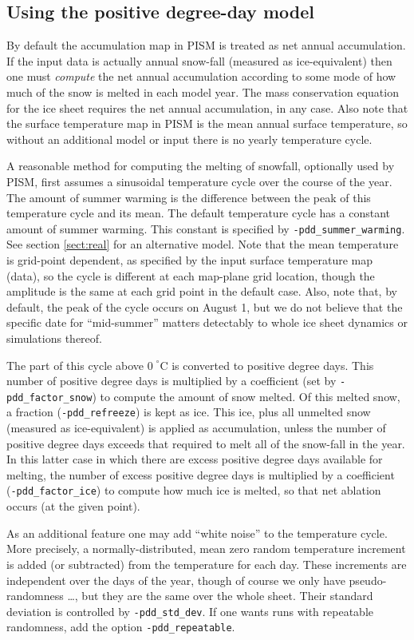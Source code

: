 \documentclass[11pt,final]{amsart}
\begin{document}
\subsection{Using the positive degree-day model}  \label{subsect:pdd}  By default the accumulation map in PISM is treated as net annual accumulation.  If the input data is actually annual snow-fall (measured as ice-equivalent) then one must \emph{compute} the net annual accumulation according to some mode of how much of the snow is melted in each model year.  The mass conservation equation for the ice sheet requires the net annual accumulation, in any case.  Also note that the surface temperature map in PISM is the mean annual surface temperature, so without an additional model or input there is no yearly temperature cycle.

A reasonable method for computing the melting of snowfall, optionally used by PISM, first assumes a sinusoidal temperature cycle over the course of the year.  The amount of summer warming is the difference between the peak of this temperature cycle and its mean.  The default temperature cycle has a constant amount of summer warming.  This constant is specified by \verb|-pdd_summer_warming|.  See section \ref{sect:real} for an alternative model.  Note that the mean temperature is grid-point dependent, as specified by the input surface temperature map (data), so the cycle is different at each map-plane grid location, though the amplitude is the same at each grid point in the default case.  Also, note that, by default, the peak of the cycle occurs on August 1, but we do not believe that the specific date for ``mid-summer'' matters detectably to whole ice sheet dynamics or simulations thereof.

The part of this cycle above $0\!\phantom{|}^\circ \text{C}$ is converted to positive degree days.  This number of positive degree days is multiplied by a coefficient (set by \verb|-pdd_factor_snow|) to compute the amount of snow melted.  Of this melted snow, a fraction (\verb|-pdd_refreeze|) is kept as ice.  This ice, plus all unmelted snow (measured as ice-equivalent) is applied as accumulation, unless the number of positive degree days exceeds that required to melt all of the snow-fall in the year.  In this latter case in which there are excess positive degree days available for melting, the number of excess positive degree days is multiplied by a coefficient (\verb|-pdd_factor_ice|) to compute how much ice is melted, so that net ablation occurs (at the given point).

As an additional feature one may add ``white noise'' to the temperature cycle.  More precisely, a normally-distributed, mean zero random temperature increment is added (or subtracted) from the temperature for each day.  These increments are independent over the days of the year, though of course we only have pseudo-randomness \dots, but they are the same over the whole sheet.  Their standard deviation is controlled by \verb|-pdd_std_dev|.  If one wants runs with repeatable randomness, add the option \verb|-pdd_repeatable|.
\end{document}
